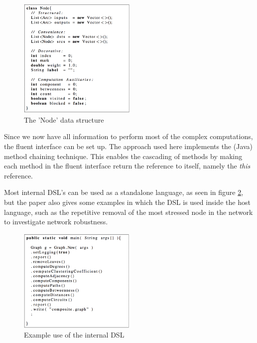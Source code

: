 \begin{figure}[!ht]
  	\centering
    	\includegraphics[width=0.5\textwidth]{images/DataStructuresJava} 
    	\caption{The 'Node' data structure}
    \label{fig:DataStructuresJava}
\end{figure}

Since we now have all information to perform most of the complex computations, the fluent interface can be set up. The approach used here implements the (Java) method chaining technique. This enables the cascading of methods by making each method in the fluent interface return the reference to itself, namely the \textit{this} reference. 

Most internal DSL's can be used as a standalone language, as seen in figure \ref{fig:MethodChainingJava}, but the paper also gives some examples in which the DSL is used inside the host language, such as the repetitive removal of the most stressed node in the network to investigate network robustness.

\begin{figure}[!ht]
  	\centering
    	\includegraphics[width=0.5\textwidth]{images/MethodChainingJava} 
    	\caption{Example use of the internal DSL}
    \label{fig:MethodChainingJava}
\end{figure}

